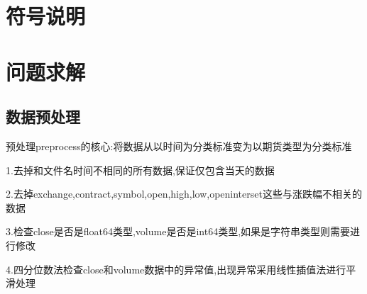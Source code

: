 \documentclass[a4paper,12pt]{ctexart}
\begin{document}
\newpage
\section{符号说明}

\section{问题求解}

\subsection{数据预处理}
预处理preprocess的核心:将数据从以时间为分类标准变为以期货类型为分类标准

1.去掉和文件名时间不相同的所有数据,保证仅包含当天的数据

2.去掉exchange,contract,symbol,open,high,low,openinterset这些与涨跌幅不相关的数据

3.检查close是否是float64类型,volume是否是int64类型,如果是字符串类型则需要进行修改

4.四分位数法检查close和volume数据中的异常值,出现异常采用线性插值法进行平滑处理
\end{document}
